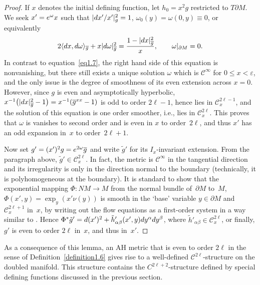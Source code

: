 \documentclass[11pt]{article}
\numberwithin{equation}{section}
\renewcommand{\epsilon}{\varepsilon}
\newcommand{\del}{\partial}
\newcommand{\olg}{\overline{g}}
\newcommand{\calC}{\mathcal C}
\begin{document}
\begin{proof}If $x$ denotes the initial defining function, let $h_0 = x^2 g$ restricted to $T\del M$. We seek $x' = {\rm e}^{\omega} x$ such that $ |{\rm d}x'/x'|^2_g = 1$, $\omega_0(y) = \omega(0,y) \equiv 0$, or equivalently
\begin{gather*} %
2 \langle {\rm d}x, {\rm d}\omega\rangle_{\olg} + x |{\rm d}\omega|^2_{\olg} = \frac{1 - |{\rm d}x|^2_{\olg}}{x}, \qquad \omega |_{\del M} = 0.
\end{gather*}
In contrast to equation~\eqref{eq1.7}, the right hand side of this equation is nonvanishing, but there still exists a unique solution $\omega$ which is $\calC^\infty$ for $0 \leq x < \epsilon$, and the only issue is the degree of smoothness of its even extension across $x=0$. However, since $g$ is even and asymptotically hyperbolic, $ x^{-1}\big(|{\rm d}x|^2_{\olg} - 1\big) = x^{-1} (\olg^{xx} - 1)$ is odd to order $2\ell-1$, hence lies in $\calC^{2\ell-1}_x$, and the solution of this equation is one order smoother, i.e., lies in $\calC^{2\ell}_x$. This proves that $\omega$ is vanishes to second order and is even in $x$ to order~$2\ell$, and thus $x'$ has an odd expansion in~$x$ to order~$2 \ell+1$.

Now set $g' = (x')^2 g = {\rm e}^{2\omega} \olg$ and write $\tilde{g}'$ for its $I_x$-invariant extension. From the paragraph above, $\tilde{g}' \in \calC^{2\ell}_x$. In fact, the metric is $\calC^\infty$ in the tangential direction and its irregularity is only in the direction normal to the boundary (technically, it is polyhomogeneous at the boundary). It is standard to show that the exponential mapping $\Phi\colon NM \to M$ from the normal bundle of~$\del M$ to~$M$, $\Phi(x',y) = \exp_y( x' \nu(y))$ is smooth in the `base' variable $y \in \del M$ and $\calC^{2\ell+1}_x$ in~$x$, by writing out the flow equations as a first-order system in a way similar to \cite[p.~6]{Guillarmou}. Hence $\Phi^*\tilde{g}' = {\rm d}(x')^2 + \tilde{h}'_{\alpha \beta}(x',y) {\rm d}y^\alpha {\rm d}y^\beta$, where $\tilde{h}'_{\alpha \beta} \in \calC^{2\ell}_x$, or finally, $g'$ is even to order $2\ell$ in~$x$, and thus in~$x'$.
\end{proof}

As a consequence of this lemma, an AH metric that is even to order $2\ell$ in the sense of Definition~\ref{definition1.6} gives rise to a well-defined $\calC^{2\ell}$-structure on the doubled manifold. This structure contains the $C^{2\ell+2}$-structure defined by special defining functions discussed in the previous section.
\end{document}
